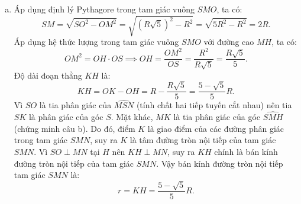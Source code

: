\begin{bt}
{\begin{enumerate}[a)]
	$$\widehat{OMK} = \widehat{OKM}.$$
	Tam giác $SMO$ vuông tại $M$ nên $\widehat{SMK} + \widehat{OMK} = \widehat{SMO} = 90^\circ$.
	Tam giác $MHK$ vuông tại $H$ nên $\widehat{HMK} + \widehat{HKM} = 90^\circ \implies \widehat{HMK} + \widehat{OKM} = 90^\circ$.
	Suy ra $\widehat{SMK} = \widehat{HMK}$, do đó $MK$ là tia phân giác của góc $\widehat{SMH}$.
	Áp dụng tính chất đường phân giác trong tam giác $SMH$, ta có:
	$$\dfrac{KS}{KH} = \dfrac{MS}{MH} \implies MH \cdot KS = KH \cdot MS.$$
	\item Áp dụng định lý Pythagore trong tam giác vuông $SMO$, ta có:
	$$SM = \sqrt{SO^2 - OM^2} = \sqrt{(R\sqrt{5})^2 - R^2} = \sqrt{5R^2 - R^2} = 2R.$$
	Áp dụng hệ thức lượng trong tam giác vuông $SMO$ với đường cao $MH$, ta có:
	$$OM^2 = OH \cdot OS \implies OH = \dfrac{OM^2}{OS} = \dfrac{R^2}{R\sqrt{5}} = \dfrac{R\sqrt{5}}{5}.$$
	Độ dài đoạn thẳng $KH$ là:
	$$KH = OK - OH = R - \dfrac{R\sqrt{5}}{5} = \dfrac{5 - \sqrt{5}}{5}R.$$
	Vì $SO$ là tia phân giác của $\widehat{MSN}$ (tính chất hai tiếp tuyến cắt nhau) nên tia $SK$ là phân giác của góc $S$.
	Mặt khác, $MK$ là tia phân giác của góc $\widehat{SMH}$ (chứng minh câu b).
	Do đó, điểm $K$ là giao điểm của các đường phân giác trong tam giác $SMN$, suy ra $K$ là tâm đường tròn nội tiếp của tam giác $SMN$.
	Vì $SO \perp MN$ tại $H$ nên $KH \perp MN$, suy ra $KH$ chính là bán kính đường tròn nội tiếp của tam giác $SMN$.
	Vậy bán kính đường tròn nội tiếp tam giác $SMN$ là:
	$$r = KH = \dfrac{5 - \sqrt{5}}{5}R.$$
\end{enumerate}
}
\end{bt}


